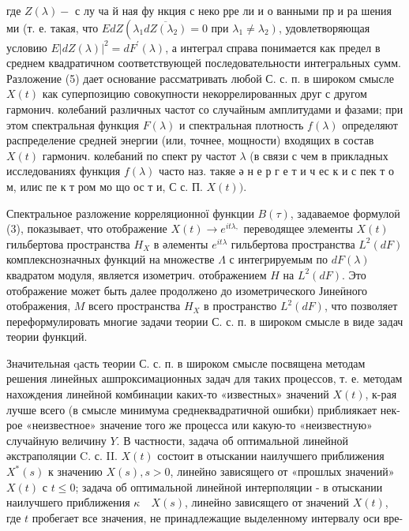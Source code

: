 \documentclass[10pt]{article}
\begin{document}
где $Z(\lambda)-$ с лу ча й ная фу нкция с неко рре ли и о ванными пр и ра шения ми (т. е. такая, что $E d Z\left(\lambda_{1} \overline{d Z\left(\lambda_{2}\right)}=0\right.$ при $\left.\lambda_{1} \neq \lambda_{2}\right)$, удовлетворяющая условию $E|d Z(\lambda)|^{2}=d F^{\prime}(\lambda)$, а интеграл справа понимается как предел в среднем квадратичном соответствующей последовательности интегральных сумм. Разложение (5) дает основание рассматривать любой С. с. п. в широком смысле $X(t)$ как суперпозицию совокупности некоррелированных друг с другом гармонич. колебаний различных частот со случайным амплитудами и фазами; при этом спектральная функция $F(\lambda)$ и спектральная плотность $f(\lambda)$ определяют распределение средней энергии (или, точнее, мощности) входящих в состав $X(t)$ гармонич. колебаний по спект ру частот $\lambda$ (в связи с чем в прикладных исследованиях функция $f(\lambda)$ часто наз. такяе ә н е р г е т и ч ес к и с пек т о м, илис пе к т ром мо що ос т и, С с. П. $X(t))$.



Спектральное разложение корреляционної функции $B(\tau)$, задаваемое формулоӥ (3), показывает, что отображение $X(t) \rightarrow e^{i t \lambda,}$ переводящее элементы $X(t)$ гильбертова пространства $H_{X}$ в әлементы $e^{i t \lambda}$ гильбертова пространства $L^{2}(d F)$ комплекснозначных функций на множестве $\Lambda$ с интегрируемым по $d F(\lambda)$ квадратом модуля, является изометрич. отображением $H$ на $L^{2}(d F)$. Это отображение может быть далее продолжено до изометрического Јинеӥного отображения, $M$ всего пространства $H_{X}$ в пространство $L^{2}(d F)$, что позволяет переформулировать многие задачи теории С. с. п. в широком смысле в виде задач теории функций.



Значительная qасть теории С. с. п. в широком смысле посвящена методам решения линейных ашпроксимационных задач для таких процессов, т. е. методам нахождения линейной комбинации каких-то «известных» значений $X(t)$, к-рая лучше всего (в смысле минимума среднеквадратичной ошибки) приблиякает нек-рое «неизвестное» значение того же процесса или какую-то «неизвестную» случайную величину $Y$. В частности, задача об оптимальной линейной әкстраполяции C. с. II. $X(t)$ состоит в отыскании наилучшего приближения $X^{*}(s)$ к значению $X(s), s>0$, линейно зависящего от «прошлых значений» $X(t)$ с $t \leqslant 0$; задача об оптимальной линейной интерполяции - в отыскании наилучшего приближения $\kappa \quad X(s)$, линейно зависящего от значений $X(t)$, где $t$ пробегает все значения, не принадлежащие выделенному интервалу оси вре-
\end{document}
